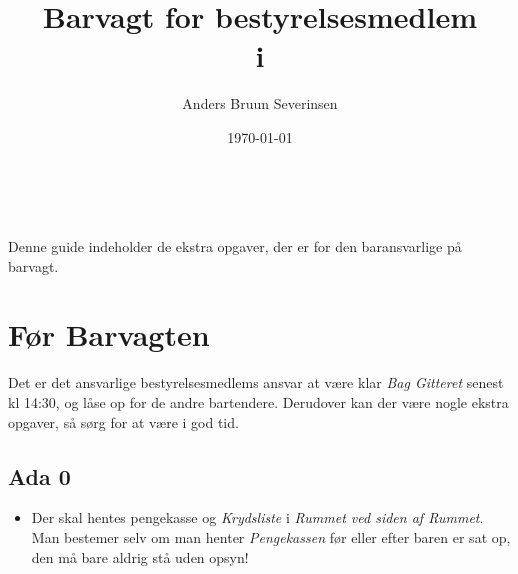 

\title{Barvagt for bestyrelsesmedlem\\ i \fredagscafeen}
\date{\today}
\author{Anders Bruun Severinsen}



\maketitle

\tableofcontents \

Denne guide indeholder de ekstra opgaver, 
der er for den baransvarlige på barvagt.

\section{Før Barvagten}
\label{sec:pre-barvagten}

Det er det ansvarlige bestyrelsesmedlems ansvar at være klar \textit{Bag Gitteret} senest kl 14:30, 
og låse op for de andre bartendere.
Derudover kan der være nogle ekstra opgaver, så sørg for at være i god tid. 

\subsection{Ada 0}
\label{sec:pre:ada}

\begin{itemize}
    \item Der skal hentes pengekasse og \textit{Krydsliste} i \textit{Rummet ved siden af 
    Rummet}. Man bestemer selv om man henter 
    \textit{Pengekassen} før eller efter baren er sat op, den må bare aldrig stå uden opsyn!
\end{itemize}

